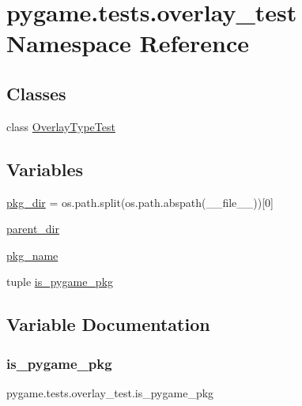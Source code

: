 \hypertarget{namespacepygame_1_1tests_1_1overlay__test}{}\section{pygame.\+tests.\+overlay\+\_\+test Namespace Reference}
\label{namespacepygame_1_1tests_1_1overlay__test}
\subsection*{Classes}
\begin{DoxyCompactItemize}
\item 
class \hyperlink{classpygame_1_1tests_1_1overlay__test_1_1_overlay_type_test}{Overlay\+Type\+Test}
\end{DoxyCompactItemize}
\subsection*{Variables}
\begin{DoxyCompactItemize}
\item 
\hyperlink{namespacepygame_1_1tests_1_1overlay__test_a84137e7f3f9e314236e285d590cf29fc}{pkg\+\_\+dir} = os.\+path.\+split(os.\+path.\+abspath(\+\_\+\+\_\+file\+\_\+\+\_\+))\mbox{[}0\mbox{]}
\item 
\hyperlink{namespacepygame_1_1tests_1_1overlay__test_affb10280ee43a799d12b1fb21de0bdcd}{parent\+\_\+dir}
\item 
\hyperlink{namespacepygame_1_1tests_1_1overlay__test_a3c466ec0909a787b9f8fe076a5d3ae83}{pkg\+\_\+name}
\item 
tuple \hyperlink{namespacepygame_1_1tests_1_1overlay__test_a4ee910fb6af3a88b5116d6c57559ec7d}{is\+\_\+pygame\+\_\+pkg}
\end{DoxyCompactItemize}


\subsection{Variable Documentation}
\mbox{\label{namespacepygame_1_1tests_1_1overlay__test_a4ee910fb6af3a88b5116d6c57559ec7d}} 
\subsubsection{\texorpdfstring{is\+\_\+pygame\+\_\+pkg}{is\_pygame\_pkg}}
{\footnotesize\ttfamily pygame.\+tests.\+overlay\+\_\+test.\+is\+\_\+pygame\+\_\+pkg}

